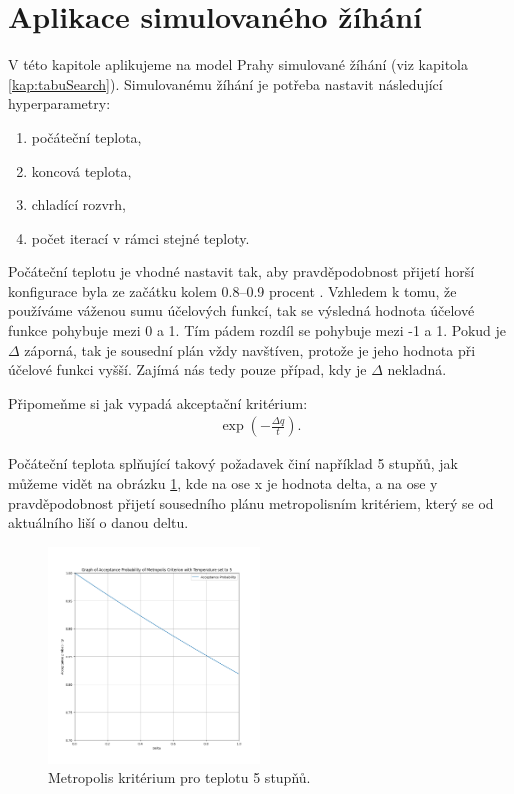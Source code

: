 \section{Aplikace simulovaného žíhání}

V této kapitole aplikujeme na model Prahy simulované žíhání (viz kapitola \ref{kap:tabuSearch}).
Simulovanému žíhání je potřeba nastavit následující hyperparametry:
\begin{enumerate}
  \item počáteční teplota,
  \item koncová teplota,
  \item chladící rozvrh,
  \item počet iterací v rámci stejné teploty.
\end{enumerate}

Počáteční teplotu je vhodné nastavit tak, aby pravděpodobnost přijetí horší konfigurace byla ze začátku kolem 0.8--0.9 procent \cite{sa_theory}.
Vzhledem k tomu, že používáme váženou sumu účelových funkcí, tak se výsledná hodnota účelové funkce pohybuje mezi 0 a 1.
Tím pádem rozdíl se pohybuje mezi -1 a 1.
Pokud je $\Delta$ záporná, tak je sousední plán vždy navštíven, protože je
jeho hodnota při účelové funkci vyšší. Zajímá nás tedy pouze případ, kdy je $\Delta$ nekladná.

Připomeňme si jak vypadá akceptační kritérium:
\begin{align*}\label{df:metropolis}
  \exp\left(-\frac{\Delta q}{t}\right).
\end{align*}

Počáteční teplota splňující takový požadavek činí například 5 stupňů, jak můžeme vidět na obrázku \ref{img:metropolis_5},
kde na ose x je hodnota delta, a na ose y pravděpodobnost přijetí sousedního plánu metropolisním kritériem, který se od aktuálního liší o danou deltu.

\begin{figure}[H]
  \centering
\includegraphics[width=0.5\textwidth,height=0.5\textwidth]{img/metropolis_5.png}
  \caption{Metropolis kritérium pro teplotu 5 stupňů.}
  \label{img:metropolis_5}
\end{figure}


